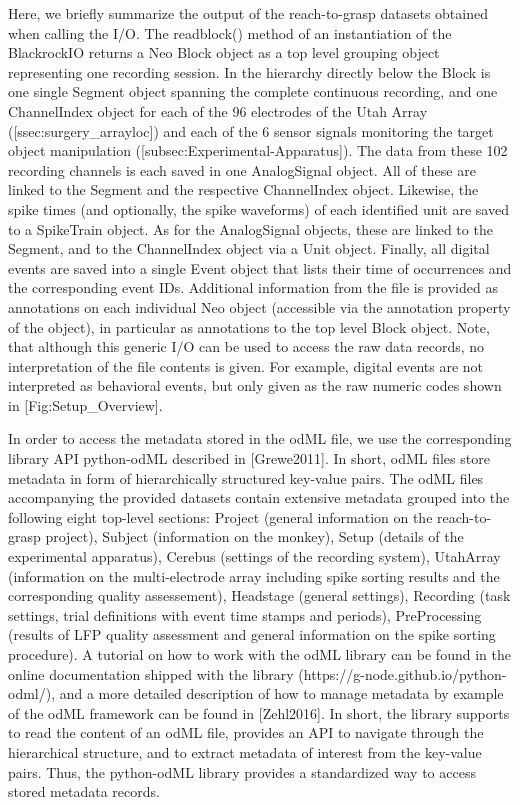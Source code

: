 {Here, we briefly summarize the output of the reach-to-grasp datasets obtained when calling the I/O. The readblock() method of an instantiation of the BlackrockIO returns a Neo Block object as a top level grouping object representing one recording session. In the hierarchy directly below the Block is one single Segment object spanning the complete continuous recording, and one ChannelIndex object for each of the 96 electrodes of the Utah Array ([ssec:surgery\_arrayloc]) and each of the 6 sensor signals monitoring the target object manipulation ([subsec:Experimental-Apparatus]). The data from these 102 recording channels is each saved in one AnalogSignal object. All of these are linked to the Segment and the respective ChannelIndex object. Likewise, the spike times (and optionally, the spike waveforms) of each identified unit are saved to a SpikeTrain object. As for the AnalogSignal objects, these are linked to the Segment, and to the ChannelIndex object via a Unit object. Finally, all digital events are saved into a single Event object that lists their time of occurrences and the corresponding event IDs. Additional information from the file is provided as annotations on each individual Neo object (accessible via the annotation property of the object), in particular as annotations to the top level Block object. Note, that although this generic I/O can be used to access the raw data records, no interpretation of the file contents is given. For example, digital events are not interpreted as behavioral events, but only given as the raw numeric codes shown in [Fig:Setup\_Overview]. 

In order to access the metadata stored in the odML file, we use the corresponding library API python-odML described in [Grewe2011]. In short, odML files store metadata in form of hierarchically structured key-value pairs. The odML files accompanying the provided datasets contain extensive metadata grouped into the following eight top-level sections: Project (general information on the reach-to-grasp project), Subject (information on the monkey), Setup (details of the experimental apparatus), Cerebus (settings of the recording system), UtahArray (information on the multi-electrode array including spike sorting results and the corresponding quality assessement), Headstage (general settings), Recording (task settings, trial definitions with event time stamps and periods), PreProcessing (results of LFP quality assessment and general information on the spike sorting procedure). A tutorial on how to work with the odML library can be found in the online documentation shipped with the library (https://g-node.github.io/python-odml/), and a more detailed description of how to manage metadata by example of the odML framework can be found in [Zehl2016]. In short, the library supports to read the content of an odML file, provides an API to navigate through the hierarchical structure, and to extract metadata of interest from the key-value pairs. Thus, the python-odML library provides a standardized way to access stored metadata records. 

}
